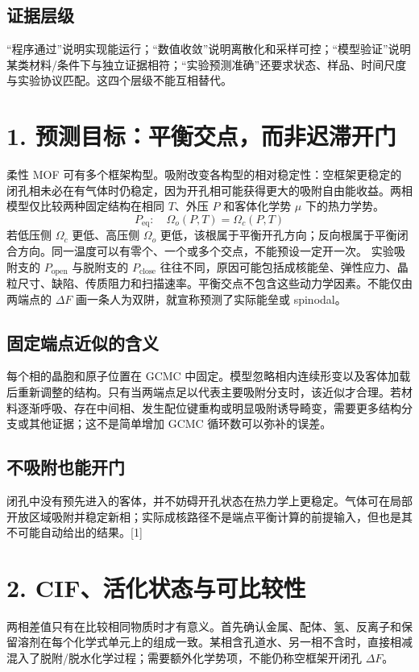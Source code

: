 \documentclass[UTF8,a4paper,11pt]{ctexart}
\begin{document}
\subsection*{证据层级}
“程序通过”说明实现能运行；“数值收敛”说明离散化和采样可控；“模型验证”说明某类材料/条件下与独立证据相符；“实验预测准确”还要求状态、样品、时间尺度与实验协议匹配。这四个层级不能互相替代。
\clearpage
\section*{1. 预测目标：平衡交点，而非迟滞开门}
柔性 MOF 可有多个框架构型。吸附改变各构型的相对稳定性：空框架更稳定的闭孔相未必在有气体时仍稳定，因为开孔相可能获得更大的吸附自由能收益。两相模型仅比较两种固定结构在相同 \(T\)、外压 \(P\) 和客体化学势 \(\mu\) 下的热力学势。
\begin{equation*}
P_{\mathrm{eq}}:\quad \Omega_o(P,T)=\Omega_c(P,T)
\end{equation*}
若低压侧 \(\Omega_c\) 更低、高压侧 \(\Omega_o\) 更低，该根属于平衡开孔方向；反向根属于平衡闭合方向。同一温度可以有零个、一个或多个交点，不能预设一定开一次。
实验吸附支的 \(P_{\mathrm{open}}\) 与脱附支的 \(P_{\mathrm{close}}\) 往往不同，原因可能包括成核能垒、弹性应力、晶粒尺寸、缺陷、传质阻力和扫描速率。平衡交点不包含这些动力学因素。不能仅由两端点的 \(\Delta F\) 画一条人为双阱，就宣称预测了实际能垒或 spinodal。
\subsection*{固定端点近似的含义}
每个相的晶胞和原子位置在 GCMC 中固定。模型忽略相内连续形变以及客体加载后重新调整的结构。只有当两端点足以代表主要吸附分支时，该近似才合理。若材料逐渐呼吸、存在中间相、发生配位键重构或明显吸附诱导畸变，需要更多结构分支或其他证据；这不是简单增加 GCMC 循环数可以弥补的误差。
\subsection*{不吸附也能开门}
闭孔中没有预先进入的客体，并不妨碍开孔状态在热力学上更稳定。气体可在局部开放区域吸附并稳定新相；实际成核路径不是端点平衡计算的前提输入，但也是其不可能自动给出的结果。[1]
\clearpage
\section*{2. CIF、活化状态与可比较性}
两相差值只有在比较相同物质时才有意义。首先确认金属、配体、氢、反离子和保留溶剂在每个化学式单元上的组成一致。某相含孔道水、另一相不含时，直接相减混入了脱附/脱水化学过程；需要额外化学势项，不能仍称空框架开闭孔 \(\Delta F\)。
\end{document}
